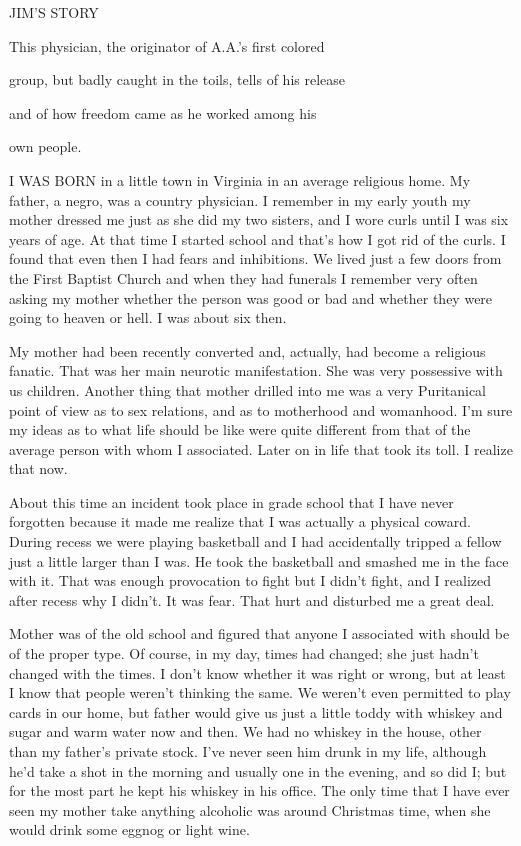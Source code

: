 
JIM’S STORY

This physician, the originator of A.A.’s first colored

group, but badly caught in the toils, tells of his release

and of how freedom came as he worked among his

own people.

 

      I WAS BORN in a little town in Virginia in an average religious home. My father, a negro, was a country physician. I remember in my early youth my mother dressed me just as she did my two sisters, and I wore curls until I was six years of age. At that time I started school and that’s how I got rid of the curls. I found that even then I had fears and inhibitions. We lived just a few doors from the First Baptist Church and when they had funerals I remember very often asking my mother whether the person was good or bad and whether they were going to heaven or hell. I was about six then.

My mother had been recently converted and, actually, had become a religious fanatic. That was her main neurotic manifestation. She was very possessive with us children. Another thing that mother drilled into me was a very Puritanical point of view as to sex relations, and as to motherhood and womanhood. I’m sure my ideas as to what life should be like were quite different from that of the average person with whom I associated. Later on in life that took its toll. I realize that now.

      About this time an incident took place in grade school that I have never forgotten because it made me realize that I was actually a physical coward. During recess we were playing basketball and I had accidentally tripped a fellow just a little larger than I was. He took the basketball and smashed me in the face with it. That was enough provocation to fight but I didn’t fight, and I realized after recess why I didn’t. It was fear. That hurt and disturbed me a great deal.

Mother was of the old school and figured that anyone I associated with should be of the proper type. Of course, in my day, times had changed; she just hadn’t changed with the times. I don’t know whether it was right or wrong, but at least I know that people weren’t thinking the same. We weren’t even permitted to play cards in our home, but father would give us just a little toddy with whiskey and sugar and warm water now and then. We had no whiskey in the house, other than my father’s private stock. I’ve never seen him drunk in my life, although he’d take a shot in the morning and usually one in the evening, and so did I; but for the most part he kept his whiskey in his office. The only time that I have ever seen my mother take anything alcoholic was around Christmas time, when she would drink some eggnog or light wine.

